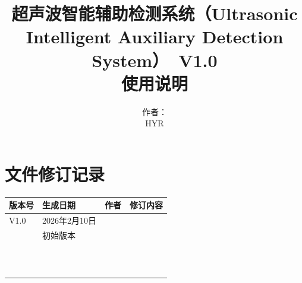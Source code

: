 \documentclass[12pt]{article}
\newcommand{\xiaoerhao}{\fontsize{18pt}{\baselineskip}\selectfont} %
\newcommand{\SoftwareName}{超声波智能辅助检测系统（Ultrasonic Intelligent Auxiliary Detection System）}
\newcommand{\Version}{V1.0}
\newcommand{\PureAuthors}{%
	HYR%
}
\newcommand{\BasicAuthor}{作者：\\\PureAuthors}
\newcommand{\RevisedAuthor}{%
	\StrSubstitute{\PureAuthors}{\\}{, }%
}
\begin{document}
	\title{\xiaoerhao\textbf{{\Huge \SoftwareName~\Version }\\
			使用说明
	}} 
	\author{ \BasicAuthor }
	\date{}
	\maketitle

	\newpage
	\tableofcontents
	
	\newpage
	\section*{文件修订记录}
	
	\renewcommand{\arraystretch}{1.5} %
	
	\begin{center}
		\begin{tabular}{ | m{1.5cm}<{\centering}|m{4cm}<{\centering} | m{5cm}<{\centering} | m{3.5cm}<{\centering} |}
			\hline
			版本号 & 生成日期 & 作者 & 修订内容 \\ %
			\hline
			\Version & 2026年2月10日 & \RevisedAuthor  & 初始版本 \\ %
			\hline
			&  &  &  \\ %
			\hline
			&  &  &  \\ %
			\hline
			&  &  &  \\ %
			\hline
			&  &  &  \\ %
			\hline
			&  &  &  \\ %
			\hline
			&  &  &  \\ %
			\hline
			&  &  &  \\ %
			\hline
			&  &  &  \\ %
			\hline
			&  &  &  \\ %
			\hline
			&  &  &  \\ %
			\hline
			&  &  &  \\ %
			\hline
		\end{tabular}
	\end{center}
	
	
	\newpage
	
	\newpage
	
	\newpage
	
	
\end{document}

